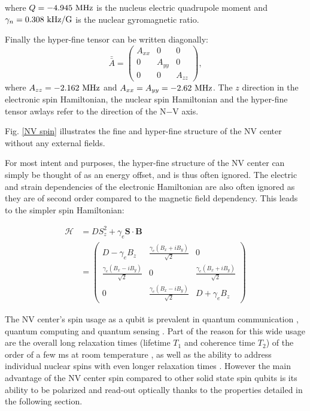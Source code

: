 \documentclass[a4paper, 11pt]{book}
\begin{document}
where $Q=-4.945\ \rm MHz$ is the nucleus electric quadrupole moment and $\gamma_n=0.308\ \rm kHz/G$ is the nuclear gyromagnetic ratio.

Finally the hyper-fine tensor can be written diagonally:
\begin{equation}
\bar{\bar{A}} = \begin{pmatrix}
A_{xx} & 0 & 0 \\
0 & A_{yy} & 0 \\
0 & 0 & A_{zz}
\end{pmatrix},
\end{equation}
where $A_{zz}=-2.162\ \rm MHz$ and $A_{xx}=A_{yy}=-2.62\ \rm MHz$. The $z$ direction in the electronic spin Hamiltonian, the nuclear spin Hamiltonian and the hyper-fine tensor awlays refer to the direction of the N$-$V axis.

Fig. \ref{NV spin} illustrates the fine and hyper-fine structure of the NV center without any external fields.

For most intent and purposes, the hyper-fine structure of the NV center can simply be thought of as an energy offset, and is thus often ignored. The electric and strain dependencies of the electronic Hamiltonian are also often ignored as they are of second order compared to the magnetic field dependency. This leads to the simpler spin Hamiltonian:

\begin{align}
\label{NV spin Hamiltonian basic}
\mathcal{H}&=D S_z^2 + \gamma_e \mathbf{S} \cdot \mathbf{B} \\
&=\begin{pmatrix}
D-\gamma_e B_z & \frac{\gamma_e (B_x+iB_y)}{\sqrt{2}} & 0 \\
\frac{\gamma_e (B_x-iB_y)}{\sqrt{2}} & 0 & \frac{\gamma_e (B_x+iB_y)}{\sqrt{2}} \\
0 & \frac{\gamma_e (B_x-iB_y)}{\sqrt{2}} & D+\gamma_e B_z
\end{pmatrix}
\end{align}

\bigskip
The NV center's spin usage as a qubit is prevalent in quantum communication \citep{wehner2018quantum}, quantum computing \citep{de2021materials} and quantum sensing \citep{degen2017quantum}. Part of the reason for this wide usage are the overall long relaxation times (lifetime $T_1$ and coherence time $T_2$) of the order of a few ms at room temperature \citep{balasubramanian2009ultralong}, as well as the ability to address individual nuclear spins with even longer relaxation times \citep{awschalom2018quantum}. However the main advantage of the NV center spin compared to other solid state spin qubits is its ability to be polarized and read-out optically thanks to the properties detailed in the following section.
\end{document}
